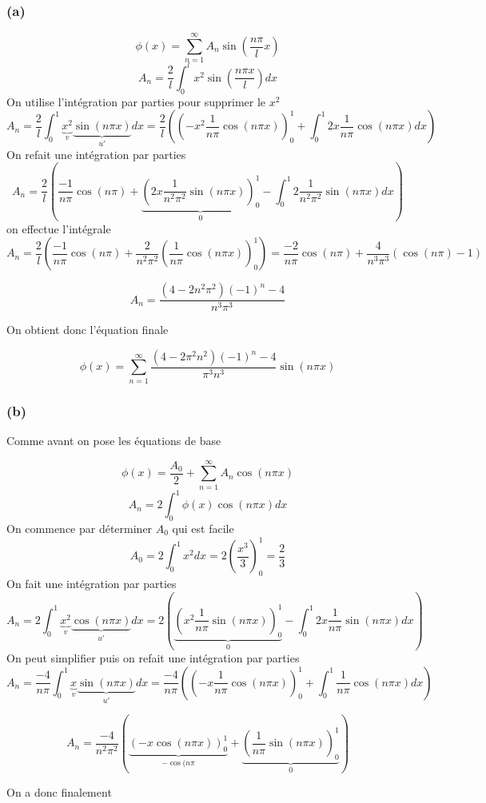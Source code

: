 \documentclass[resume]{subfiles}
\begin{document}
\begin{multicols}{2}
\subsubsection{(a)}
$$\phi(x)=\sum_{n=1}^{\infty}A_n\sin\left(\frac{n\pi}{l}x\right)$$
$$A_n=\frac{2}{l}\int_{0}^{l}x^2\sin\left(\frac{n\pi x}{l}\right)dx$$
On utilise l'intégration par parties pour supprimer le $x^2$
$$A_n=\frac{2}{l}\int_{0}^{1}\underbrace{x^2}_{v}\underbrace{\sin(n\pi x)}_{u'}dx=\frac{2}{l}\left(\left(-x^2\frac{1}{n\pi}\cos(n\pi x)\right)^{1}_{0}+\int_{0}^{1}2x\frac{1}{n\pi}\cos(n\pi x)dx\right)$$
On refait une intégration par parties
$$A_n=\frac{2}{l}\left(\frac{-1}{n\pi}\cos(n\pi)+\underbrace{\left(2x\frac{1}{n^2\pi^2}\sin\left(n\pi x\right)\right)_0^1}_{0}-\int_{0}^{1}2\frac{1}{n^2\pi^2}\sin(n\pi x)dx\right)$$
on effectue l'intégrale
$$A_n=\frac{2}{l}\left(\frac{-1}{n\pi}\cos(n\pi)+\frac{2}{n^2\pi^2}\left(\frac{1}{n\pi}\cos(n\pi x)\right)_0^1\right)=\frac{-2}{n\pi}\cos(n\pi)+\frac{4}{n^3\pi^3}\left(\cos(n\pi)-1\right)$$

$$A_n=\frac{(4-2n^2\pi^2)(-1)^n-4}{n^3\pi^3}$$

On obtient donc l'équation finale

$$\boxed{\phi(x)=\sum_{n=1}^{\infty}\frac{(4-2\pi^2n^2)(-1)^n-4}{\pi^3n^3}\sin(n\pi x)}$$
\subsubsection{(b)}

Comme avant on pose les équations de base

$$\phi(x)=\frac{A_0}{2}+\sum_{n=1}^{\infty}A_n\cos(n\pi x)$$
$$A_n=2\int_{0}^{1}\phi(x)\cos(n\pi x)dx$$
On commence par déterminer $A_0$ qui est facile
$$A_0=2\int_{0}^{1}x^2dx=2\left(\frac{x^3}{3}\right)^{1}_{0}=\frac{2}{3}$$
On fait une intégration par parties
$$A_n=2\int_{0}^{1}\underbrace{x^2}_{v}\underbrace{\cos(n\pi x)}_{u'}dx=2\left(\underbrace{\left(x^2\frac{1}{n\pi}\sin(n\pi x)\right)^{1}_{0}}_{0}-\int_{0}^{1}2x\frac{1}{n\pi}\sin(n\pi x)dx\right)$$
On peut simplifier puis on refait une intégration par parties
$$A_n=\frac{-4}{n\pi}\int_{0}^{1}\underbrace{x}_{v}\underbrace{\sin(n\pi x)}_{u'}dx=\frac{-4}{n\pi}\left(\left(-x\frac{1}{n\pi}\cos(n\pi x)\right)_{0}^{1}+\int_{0}^{1}\frac{1}{n\pi}\cos(n\pi x)dx\right)$$

$$A_n=\frac{-4}{n^2\pi^2}\left(\underbrace{(-x\cos(n\pi x))^{1}_{0}}_{-\cos(n\pi}+\underbrace{\left(\frac{1}{n\pi}\sin(n\pi x)\right)_{0}^{1}}_{0}\right)$$

On a donc finalement


\end{multicols}
\end{document}

